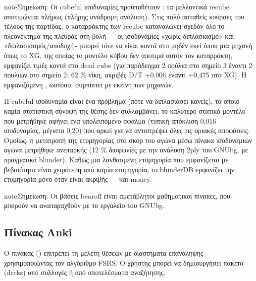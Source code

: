\documentclass[letterpaper,10pt,greek]{sphinxmanual}
\begin{document}
\begin{sphinxadmonition}{note}{Σημείωση:}
\sphinxAtStartPar
Οι cubeful ισοδυναμίες προϋποθέτουν : τα μελλοντικά recube αποτιμώνται πλήρως (πλήρης ανάδρομη ανάλυση). Στις πολύ ασταθείς κούρσες του τέλους της παρτίδας, ο καταρράκτης των recube καταναλώνει σχεδόν όλο το πλεονέκτημα της πλευράς στη βολή — οι ισοδυναμίες «χωρίς διπλασιασμό» και «διπλασιασμός/αποδοχή» μπορεί τότε να είναι κοντά στο μηδέν εκεί όπου μια μηχανή όπως το XG, της οποίας το μοντέλο κύβου δεν αποτιμά αυτόν τον καταρράκτη, εμφανίζει τιμές κοντά στο dead cube (για παράδειγμα 2 πούλια στο σημείο 3 έναντι 2 πουλιών στο σημείο 2: 62 \% νίκη, ακριβές D/T +0,006 έναντι +0,475 στο XG). Η εμφανιζόμενη , ωστόσο, συμπίπτει με εκείνη των μηχανών.
\end{sphinxadmonition}

\sphinxAtStartPar
{} Η cubeful ισοδυναμία είναι ένα πρόβλημα  (πότε να διπλασιάσει κανείς), το οποίο καμία στατιστική σύνοψη της θέσης δεν συλλαμβάνει: το καλύτερο στατικό μοντέλο που μετρήθηκε αφήνει ένα υπολειπόμενο σφάλμα (τυπική απόκλιση 0,016 ισοδυναμίας, μέγιστο 0,20) που αρκεί για να αντιστρέψει όλες τις οριακές αποφάσεις. Ομοίως, η μετατροπή της ετυμηγορίας στο σκορ του αγώνα μέσω πίνακα ισοδυναμιών αγώνα μετρήθηκε ανεπαρκής (12 \% διαφωνίες με την ανάλυση 2\sphinxhyphen{}ply του GNUbg, με πραγματικά blunder). Καθώς μια λανθασμένη ετυμηγορία που εμφανίζεται με βεβαιότητα είναι χειρότερη από καμία ετυμηγορία, το blunderDB εμφανίζει την ετυμηγορία μόνο όταν είναι ακριβής — και money.

\begin{sphinxadmonition}{note}{Σημείωση:}
\sphinxAtStartPar
Οι βάσεις bearoff είναι αμετάβλητοι μαθηματικοί πίνακες, που μπορούν να αναπαραχθούν με το εργαλείο  του GNUbg.
\end{sphinxadmonition}


\subsection{Πίνακας Anki}
\label{\detokenize{manuel:panneau-anki}}\label{\detokenize{manuel:id10}}
\sphinxAtStartPar
Ο πίνακας  () επιτρέπει τη μελέτη θέσεων με διαστήματα επανάληψης χρησιμοποιώντας τον αλγόριθμο FSRS. Ο χρήστης μπορεί να δημιουργήσει πακέτα (decks) από συλλογές ή από αποτελέσματα αναζήτησης.
\end{document}
